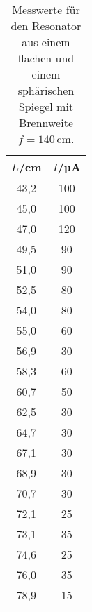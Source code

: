 \newpage
{}
\label{sec:Anhang}

\begin{table}[htp]
  \caption{Messwerte für den Resonator aus einem flachen und einem sphärischen Spiegel mit Brennweite $f=140$\,cm.}
  \label{tab:plankonkav}
	\begin{center}
		\begin{tabular}{cc}
		\toprule
			{$L$/cm} & {$I$/µA}\\
			\midrule
			43,2 & 100\\
			45,0 & 100\\
			47,0 & 120\\
			49,5 & 90\\
			51,0 & 90\\
			52,5 & 80\\
			54,0 & 80\\
			55,0 & 60\\
			56,9 & 30\\
			58,3 & 60\\
			60,7 & 50\\
			62,5 & 30\\
			64,7 & 30\\
			67,1 & 30\\
			68,9 & 30\\
			70,7 & 30\\
			72,1 & 25\\
			73,1 & 35\\
			74,6 & 25\\
			76,0 & 35\\
			78,9 & 15\\
		\bottomrule
		\end{tabular}
	\end{center}
\end{table}

